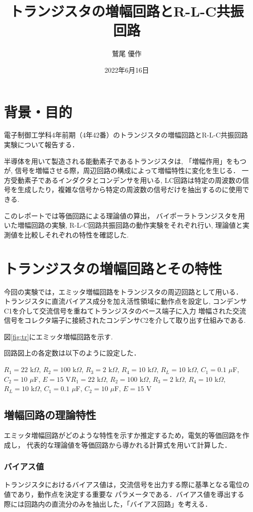 \documentclass[dvipdfmx,titlepage,a4j]{jsarticle}  %
\title{トランジスタの増幅回路とR-L-C共振回路}
\author{鷲尾 優作}
\date{2022年6月16日}
\begin{document}
\pagestyle{foot}

\maketitle

\section{背景・目的}
電子制御工学科4年前期（4年42番）のトランジスタの増幅回路とR-L-C共振回路実験について報告する．

半導体を用いて製造される能動素子であるトランジスタは, 「増幅作用」をもつが, 信号を増幅させる際，周辺回路の構成によって増幅特性に変化を生じる．
一方受動素子であるインダクタとコンデンサを用いる, LC回路は特定の周波数の信号を生成したり，複雑な信号から特定の周波数の信号だけを抽出するのに使用できる.

このレポートでは等価回路による理論値の算出，
バイポーラトランジスタを用いた増幅回路の実験, R-L-C回路共振回路の動作実験をそれぞれ行い,
理論値と実測値を比較しそれぞれの特性を確認した.

\section{トランジスタの増幅回路とその特性}
今回の実験では，エミッタ増幅回路をトランジスタの周辺回路として用いる．
トランジスタに直流バイアス成分を加え活性領域に動作点を設定し,
コンデンサC1を介して交流信号を重ねてトランジスタのベース端子に入力
増幅された交流信号をコレクタ端子に接続されたコンデンサC2を介して取り出す仕組みである.

図\ref{fig:tr}にエミッタ増幅回路を示す.

回路図上の各定数は以下のように設定した．

$R_1 = 22$ k$\Omega$, $R_2 = 100$ k$\Omega$, $R_3 = 2$ k$\Omega$, $R_4 = 10$ k$\Omega$,
$R_L = 10$ k$\Omega$, $C_1 = 0.1$ $\mu$F, $C_2 = 10$ $\mu$F, $E = 15$ V$R_1 = 22$ k$\Omega$, $R_2 = 100$ k$\Omega$, $R_3 = 2$ k$\Omega$, $R_4 = 10$ k$\Omega$,
$R_L = 10$ k$\Omega$, $C_1 = 0.1$ $\mu$F, $C_2 = 10$ $\mu$F, $E = 15$ V

\subsection{増幅回路の理論特性}
エミッタ増幅回路がどのような特性を示すか推定するため，電気的等価回路を作成し，
代表的な理論値を等価回路から導かれる計算式を用いて計算した．

\subsubsection{バイアス値}
トランジスタにおけるバイアス値は，交流信号を出力する際に基準となる電位の値であり，動作点を決定する重要な
パラメータである．バイアス値を導出する際には回路内の直流分のみを抽出した，「バイアス回路」を考える．
\end{document}

